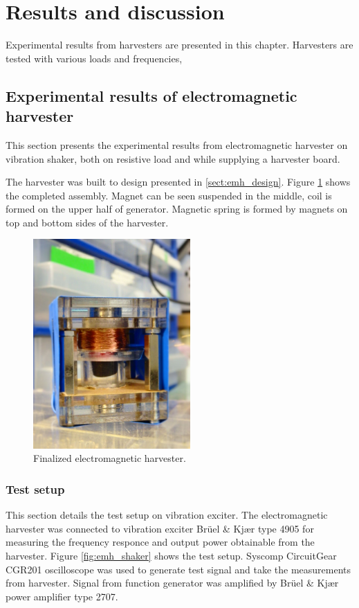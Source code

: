 \section{Results and discussion}
Experimental results from harvesters are presented in this chapter. Harvesters are tested with various loads and frequencies, 

\subsection{Experimental results of electromagnetic harvester}
This section presents the experimental results from electromagnetic harvester on vibration shaker, both on resistive load and while supplying a harvester board. 

The harvester was built to design presented in \ref{sect:emh_design}. Figure \ref{fig:emh_final} shows the completed assembly. Magnet can be seen suspended in the middle, coil is formed on the upper half of generator. Magnetic spring is formed by magnets on top and bottom sides of the harvester. 

\begin{figure}[htb]
\begin{center}
\includegraphics[height=8cm]{images/own_pic/inductive_harvester.jpg}
\end{center}
\caption{\label{fig:emh_final} Finalized electromagnetic harvester.}
\end{figure}


\subsubsection{Test setup} \label{sect:lg_test_setup}
This section details the test setup on vibration exciter. The electromagnetic harvester was connected to vibration exciter Brüel \& Kjær type 4905 for measuring the frequency responce and output power obtainable from the harvester. Figure \ref{fig:emh_shaker} shows the test setup. Syscomp CircuitGear CGR201 oscilloscope was used to generate test signal and take the measurements from harvester. Signal from function generator was amplified by Brüel \& Kjær power amplifier type 2707.

